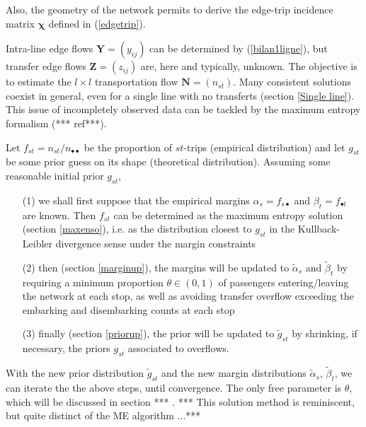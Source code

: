 \documentclass{bmcart}
\begin{document}
Also, the geometry of the network permits to derive the edge-trip incidence matrix $\bm{\chi}$ defined in (\ref{edgetrip}). 


Intra-line edge flows $\mathbf{Y}=(y_{ij})$ can be determined by (\ref{bilan1ligne}), but transfer edge flows $\mathbf{Z}=(z_{ij})$ are, here and typically, unknown. The objective is to estimate the $l\times l$ transportation flow $\mathbf{N}=(n_{st})$. Many consistent solutions coexist in general, even for a single line with no transferts (section \ref{Single line}). This issue of incompletely observed data can be tackled by the maximum entropy formalism (*** ref***). 


Let $f_{st}=n_{st}/n_{\bullet\bullet}$ be the proportion of $st$-trips (empirical distribution) and let $g_{st}$ be some prior guess on its shape (theoretical distribution). 
Assuming some reasonable initial prior $g_{st}$, 
\begin{itemize}
\item[(1)] we shall first suppose that the empirical margins $\alpha_s=f_{s\bullet}$ and $\beta_t=f_{\bullet t}$ are known.  
Then $f_{st}$ can be determined as the maximum entropy solution (section \ref{maxenso}), i.e. as the distribution closest to $g_{st}$ in the Kullback-Leibler divergence sense under the margin constraints
\item[(2)] then (section \ref{marginup}), the margins will be updated to $\tilde{\alpha}_s$ and $\tilde{\beta}_t$   by requiring a minimum proportion $\theta\in (0,1)$ of passengers entering/leaving the network at each stop, as well as avoiding transfer overflow exceeding the embarking and disembarking counts at each stop
 \item[(3)] finally (section \ref{priorup}), the prior will be updated to $\tilde{g}_{st}$ by shrinking, if necessary, the priors $g_{st}$ associated to overflows. 
\end{itemize}
With the new prior distribution $\widetilde{g}_{st}$ and the new margin distributions $\widetilde{\alpha}_s$, $\widetilde{\beta}_t$, we can iterate the 
 the above steps, until convergence. The only free parameter is $\theta$, which will be discussed in section *** . *** This solution method is reminiscent, but quite distinct of the ME algorithm ...***
\end{document}
